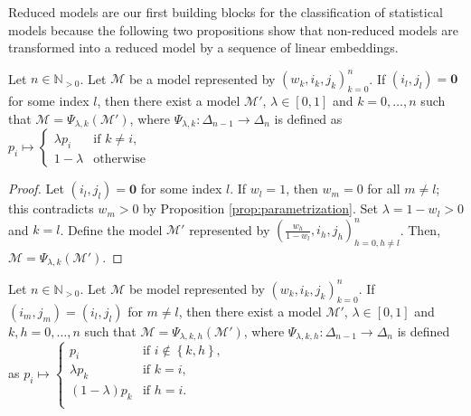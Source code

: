 Reduced models are our first building blocks for the classification of statistical models because the following two propositions show that non-reduced models are transformed into a reduced model by a sequence of linear embeddings.

\begin{proposition}\label{prop:linear-embedding-1}
    Let \( n \in \mathbb{N}_{>0} \).
    Let \( \mathcal{M} \) be a model represented by \( (w_k, i_k, j_k)_{k=0}^n \). If \( (i_l, j_l) = \mathbf{0} \) for some index \( l \), then there exist a model \( \mathcal{M}' \), \( \lambda \in [0,1] \) and \( k = 0, \dots, n \) such that \( \mathcal{M} = \Psi_{\lambda,k}(\mathcal{M}') \), where \( \Psi_{\lambda, k}: \Delta_{n-1} \to \Delta_n \) is defined as \(  p_i \mapsto \begin{cases}
        \lambda p_i & \text{if } k \neq i, \\
        1-\lambda & \text{otherwise }
    \end{cases} \)
\end{proposition}

\begin{proof}
    Let \( (i_l, j_l) = \mathbf{0} \) for some index \( l \). If \( w_l = 1 \), then \( w_m = 0 \) for all \( m \neq l \); this contradicts \( w_m > 0 \) by Proposition \ref{prop:parametrization}. Set \( \lambda = 1 - w_l > 0 \) and \( k = l \). Define the model \( \mathcal{M}' \) represented by \( \left(\frac{w_h}{1-w_l}, i_h, j_h\right)^n_{h=0, h \neq l} \).
    Then, \( \mathcal{M} = \Psi_{\lambda,k}(\mathcal{M}') \).
\end{proof}

\begin{proposition}\label{prop:linear-embedding-2}
    Let \( n \in \mathbb{N}_{>0} \).
    Let \( \mathcal{M} \) be model represented by \( (w_k, i_k, j_k)_{k=0}^n \). If \( (i_m, j_m) = (i_l, j_l)  \) for \( m \neq l \), then there exist a model \( \mathcal{M}' \), \( \lambda \in [0,1] \) and \( k,h = 0, \dots, n \) such that \( \mathcal{M} = \Psi_{\lambda,k,h}(\mathcal{M}') \), 
    where \( \Psi_{\lambda, k,h}: \Delta_{n-1} \to \Delta_n \) is defined as \(  p_i \mapsto \begin{cases}
         p_i & \text{if } i \notin \left\{ k,h \right\}, \\
        \lambda p_k & \text{if } k = i, \\
        (1-\lambda) p_k & \text{if } h = i. \\
    \end{cases} \)
\end{proposition}

